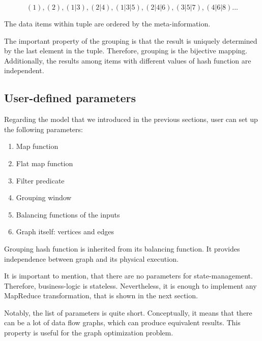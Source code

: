 \[(1), (2), (1|3), (2|4), (1|3|5), (2|4|6), (3|5|7), (4|6|8)...\]

The data items within tuple are ordered by the meta-information. 

The important property of the grouping is that the result is uniquely determined by the last element in the tuple. Therefore, grouping is the bijective mapping. Additionally, the results among items with different values of hash function are independent.

\subsection{User-defined parameters}

Regarding the model that we introduced in the previous sections, user can set up the following parameters:

\begin{enumerate}
  \item{Map function}
  \item{Flat map function}
  \item{Filter predicate}
  \item{Grouping window}
  \item{Balancing functions of the inputs}
  \item{Graph itself: vertices and edges}
\end{enumerate}

Grouping hash function is inherited from its balancing function. It provides independence between graph and its physical execution. 

It is important to mention, that there are no parameters for state-management. Therefore, business-logic is stateless. Nevertheless, it is enough to implement any MapReduce transformation, that is shown in the next section.

Notably, the list of parameters is quite short. Conceptually, it means that there can be a lot of data flow graphs, which can produce equivalent results. This property is useful for the graph optimization problem.    


